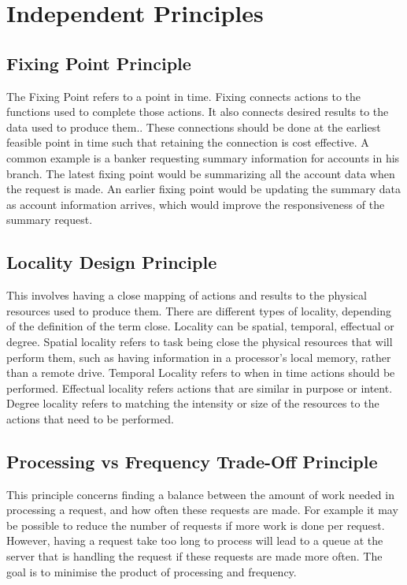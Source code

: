 \documentclass[a4paper,11pt,article,oneside]{memoir}
\begin{document}
	\section{Independent Principles}
	\subsection{Fixing Point Principle}
	The Fixing Point refers to a point in time. Fixing connects actions to the functions used to complete those actions. It also connects desired results to the data used to produce them.. These connections should be done at the earliest feasible point in time such that retaining the connection is cost effective. A common example is a banker requesting summary information for accounts in his branch. The latest fixing point would be summarizing all the account data when the request is made. An earlier fixing point would be updating the summary data as account information arrives, which would improve the responsiveness of the summary request.
	
	\subsection{Locality Design Principle}
	This involves having a close mapping of actions and results to the physical resources used to produce them. There are different types of locality, depending of the definition of the term close. Locality can be spatial, temporal, effectual or degree. Spatial locality refers to task being close the physical resources that will perform them, such as having information in a processor's local memory, rather than a remote drive. Temporal Locality refers to when in time actions should be performed. Effectual locality refers actions that are similar in purpose or intent. Degree locality refers to matching the intensity or size of the resources to the actions that need to be performed. 
	
	\subsection{Processing vs Frequency Trade-Off Principle}
	This principle concerns finding a balance between the amount of work needed in processing a request, and how often these requests are made. For example it may be possible to reduce the number of requests if more work is done per request. However, having a request take too long to process will lead to a queue at the server that is handling the request if these requests are made more often. The goal is to minimise the product of processing and frequency.
	
\end{document}
